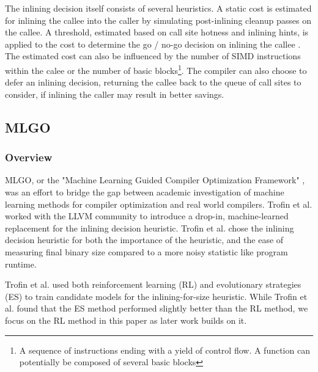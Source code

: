 \documentclass[nohyperref]{article}
\theoremstyle{plain}
\theoremstyle{definition}
\theoremstyle{remark}
\begin{document}
The inlining decision itself consists of several heuristics. A static cost is estimated for inlining the callee into the caller by simulating post-inlining cleanup passes on the callee. A threshold, estimated based on call site hotness and inlining hints, is applied to the cost to determine the go / no-go decision on inlining the callee \cite{mlgo}. The estimated cost can also be influenced by the number of SIMD instructions within the calee or the number of basic blocks\footnote{A sequence of instructions ending with a yield of control flow. A function can potentially be composed of several basic blocks}. The compiler can also choose to defer an inlining decision, returning the callee back to the queue of call sites to consider, if inlining the caller may result in better savings.



\subsection{MLGO}
\subsubsection{Overview}
MLGO, or the "Machine Learning Guided Compiler Optimization Framework" \cite{mlgo}, was an effort to bridge the gap between academic investigation of machine learning methods for compiler optimization and real world compilers. Trofin et al. worked with the LLVM community to introduce a drop-in, machine-learned replacement for the inlining decision heuristic. Trofin et al. chose the inlining decision heuristic for both the importance of the heuristic, and the ease of measuring final binary size compared to a more noisy statistic like program runtime.

Trofin et al. used both reinforcement learning (RL) and evolutionary strategies (ES) to train candidate models for the inlining-for-size heuristic. While Trofin et al. found that the ES method performed slightly better than the RL method, we focus on the RL method in this paper as later work builds on it.
\end{document}
